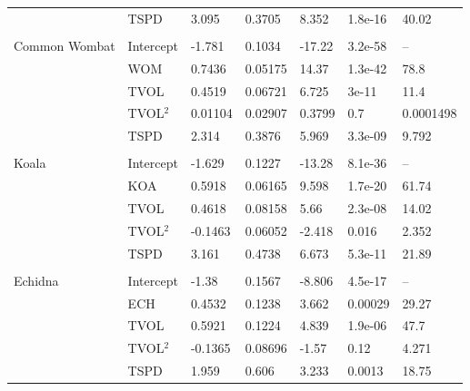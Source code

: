 \begin{table}[ht]
{\begin{tabular}{lllllll}
   & TSPD & 3.095 & 0.3705 & 8.352 & 1.8e-16 & 40.02 \\ 
   &  &  &  &  &  &  \\ 
Common Wombat & Intercept & -1.781 & 0.1034 & -17.22 & 3.2e-58 & -- \\ 
   & WOM & 0.7436 & 0.05175 & 14.37 & 1.3e-42 & 78.8 \\ 
   & TVOL & 0.4519 & 0.06721 & 6.725 & 3e-11 & 11.4 \\ 
   & TVOL$^2$ & 0.01104 & 0.02907 & 0.3799 & 0.7 & 0.0001498 \\ 
   & TSPD & 2.314 & 0.3876 & 5.969 & 3.3e-09 & 9.792 \\ 
   &  &  &  &  &  &  \\ 
Koala & Intercept & -1.629 & 0.1227 & -13.28 & 8.1e-36 & -- \\ 
   & KOA & 0.5918 & 0.06165 & 9.598 & 1.7e-20 & 61.74 \\ 
   & TVOL & 0.4618 & 0.08158 & 5.66 & 2.3e-08 & 14.02 \\ 
   & TVOL$^2$ & -0.1463 & 0.06052 & -2.418 & 0.016 & 2.352 \\ 
   & TSPD & 3.161 & 0.4738 & 6.673 & 5.3e-11 & 21.89 \\ 
   &  &  &  &  &  &  \\ 
Echidna & Intercept & -1.38 & 0.1567 & -8.806 & 4.5e-17 & -- \\ 
   & ECH & 0.4532 & 0.1238 & 3.662 & 0.00029 & 29.27 \\ 
   & TVOL & 0.5921 & 0.1224 & 4.839 & 1.9e-06 & 47.7 \\ 
   & TVOL$^2$ & -0.1365 & 0.08696 & -1.57 & 0.12 & 4.271 \\ 
   & TSPD & 1.959 & 0.606 & 3.233 & 0.0013 & 18.75 \\  
\bottomrule
\end{tabular}
}
\label{sum_coll_7sp}
\end{table}